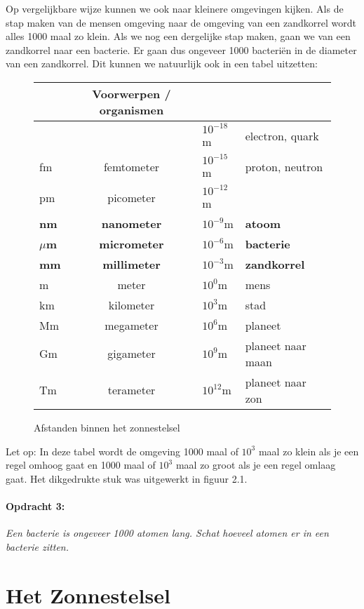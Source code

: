 Op vergelijkbare wijze kunnen we ook naar kleinere omgevingen kijken.
Als de stap maken van de mensen omgeving naar de omgeving van een
zandkorrel wordt alles 1000 maal zo klein. Als we nog een dergelijke
stap maken, gaan we van een zandkorrel naar een bacterie. Er gaan
dus ongeveer 1000 bacteriën in de diameter van een zandkorrel. Dit
kunnen we natuurlijk ook in een tabel uitzetten:

\begin{figure}[h]
\noindent \begin{centering}
\begin{tabular}{|>{\centering}p{1.5cm}|c|>{\centering}p{2cm}|>{\centering}p{7.5cm}|}
\hline 
\multicolumn{3}{|>{\centering}p{7.5cm}|}{Eenheid} & Voorwerpen / organismen\tabularnewline
\hline 
\hline 
 &  & $10^{-18}$m & electron, quark\tabularnewline
\hline 
fm & femtometer & $10^{-15}$m & proton, neutron\tabularnewline
\hline 
pm & picometer & $10^{-12}$m & \tabularnewline
\hline 
\textbf{nm} & \textbf{nanometer} & \textbf{$10^{-9}$}m & \textbf{atoom}\tabularnewline
\hline 
\textbf{$\mu$m} & \textbf{micrometer} & \textbf{$10^{-6}$}m & \textbf{bacterie}\tabularnewline
\hline 
\textbf{mm} & \textbf{millimeter} & \textbf{$10^{-3}$}m & \textbf{zandkorrel}\tabularnewline
\hline 
m & meter & $10^{0}$m & mens\tabularnewline
\hline 
km & kilometer & $10^{3}$m & stad\tabularnewline
\hline 
Mm & megameter & $10^{6}$m & planeet\tabularnewline
\hline 
Gm & gigameter & $10^{9}$m & planeet naar maan\tabularnewline
\hline 
Tm & terameter & $10^{12}$m & planeet naar zon\tabularnewline
\hline 
\end{tabular}
\par\end{centering}

\caption{Afstanden binnen het zonnestelsel}
\end{figure}


Let op: In deze tabel wordt de omgeving 1000 maal of $10^{3}$ maal
zo klein als je een regel omhoog gaat en 1000 maal of $10^{3}$ maal
zo groot als je een regel omlaag gaat. Het dikgedrukte stuk was uitgewerkt
in figuur 2.1.


\paragraph*{Opdracht 3:}

\emph{Een bacterie is ongeveer 1000 atomen lang. Schat hoeveel atomen
er in een bacterie zitten.}


\section{Het Zonnestelsel}


